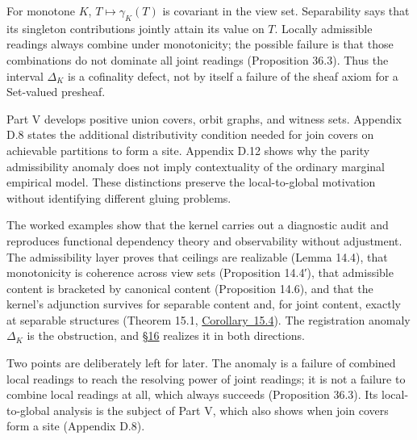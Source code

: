 
For monotone \(K\), \(T\mapsto\gamma_K(T)\) is covariant in the view set. Separability says that its singleton contributions jointly attain its value on \(T\). Locally admissible readings always combine under monotonicity; the possible failure is that those combinations do not dominate all joint readings (Proposition 36.3). Thus the interval \(\Delta_K\) is a cofinality defect, not by itself a failure of the sheaf axiom for a Set-valued presheaf.

Part V develops positive union covers, orbit graphs, and witness sets. Appendix D.8 states the additional distributivity condition needed for join covers on achievable partitions to form a site. Appendix D.12 shows why the parity admissibility anomaly does not imply contextuality of the ordinary marginal empirical model. These distinctions preserve the local-to-global motivation without identifying different gluing problems.


The worked examples show that the kernel carries out a diagnostic audit and reproduces functional dependency theory and observability without adjustment. The admissibility layer proves that ceilings are realizable (Lemma 14.4), that monotonicity is coherence across view sets (Proposition 14.4′), that admissible content is bracketed by canonical content (Proposition 14.6), and that the kernel's adjunction survives for separable content and, for joint content, exactly at separable structures (Theorem 15.1, \hyperlink{stmt:15.4}{Corollary~15.4}). The registration anomaly \(\Delta_K\) is the obstruction, and \hyperlink{sec:16}{§16} realizes it in both directions.

Two points are deliberately left for later. The anomaly is a failure of combined local readings to reach the resolving power of joint readings; it is not a failure to combine local readings at all, which always succeeds (Proposition 36.3). Its local-to-global analysis is the subject of Part V, which also shows when join covers form a site (Appendix D.8).
